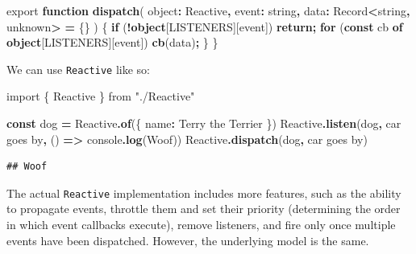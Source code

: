 \documentclass[
]{book}
\newenvironment{Shaded}{\begin{snugshade}}{\end{snugshade}}
\newcommand{\BuiltInTok}[1]{#1}
\newcommand{\ControlFlowTok}[1]{\textcolor[rgb]{0.13,0.29,0.53}{\textbf{#1}}}
\newcommand{\DataTypeTok}[1]{\textcolor[rgb]{0.13,0.29,0.53}{#1}}
\newcommand{\FunctionTok}[1]{\textcolor[rgb]{0.13,0.29,0.53}{\textbf{#1}}}
\newcommand{\ImportTok}[1]{#1}
\newcommand{\KeywordTok}[1]{\textcolor[rgb]{0.13,0.29,0.53}{\textbf{#1}}}
\newcommand{\NormalTok}[1]{#1}
\newcommand{\OperatorTok}[1]{\textcolor[rgb]{0.81,0.36,0.00}{\textbf{#1}}}
\newcommand{\StringTok}[1]{\textcolor[rgb]{0.31,0.60,0.02}{#1}}
\newcommand{\VerbatimStringTok}[1]{\textcolor[rgb]{0.31,0.60,0.02}{#1}}
\theoremstyle{definition}
\theoremstyle{definition}
\theoremstyle{definition}
\theoremstyle{definition}
\theoremstyle{remark}
\begin{document}
\begin{Shaded}
\begin{Highlighting}[]
  \ImportTok{export} \KeywordTok{function} \FunctionTok{dispatch}\NormalTok{(}
\NormalTok{    object}\OperatorTok{:}\NormalTok{ Reactive}\OperatorTok{,}
\NormalTok{    event}\OperatorTok{:} \DataTypeTok{string}\OperatorTok{,}
\NormalTok{    data}\OperatorTok{:} \BuiltInTok{Record}\OperatorTok{\textless{}}\DataTypeTok{string}\OperatorTok{,} \DataTypeTok{unknown}\OperatorTok{\textgreater{}} \OperatorTok{=}\NormalTok{ \{\}}
\NormalTok{  ) \{}
    \ControlFlowTok{if}\NormalTok{ (}\OperatorTok{!}\KeywordTok{object}\NormalTok{[LISTENERS][}\BuiltInTok{event}\NormalTok{]) }\ControlFlowTok{return}\OperatorTok{;}
    \ControlFlowTok{for}\NormalTok{ (}\KeywordTok{const}\NormalTok{ cb }\KeywordTok{of} \KeywordTok{object}\NormalTok{[LISTENERS][}\BuiltInTok{event}\NormalTok{]) }\FunctionTok{cb}\NormalTok{(data)}\OperatorTok{;}
\NormalTok{  \}}
\NormalTok{\}}
\end{Highlighting}
\end{Shaded}

We can use \texttt{Reactive} like so:

\begin{Shaded}
\begin{Highlighting}[]
\ImportTok{import}\NormalTok{ \{ Reactive \} }\ImportTok{from} \StringTok{"./Reactive"}

\KeywordTok{const}\NormalTok{ dog }\OperatorTok{=}\NormalTok{ Reactive}\OperatorTok{.}\FunctionTok{of}\NormalTok{(\{ name}\OperatorTok{:} \VerbatimStringTok{\textasciigrave{}Terry the Terrier\textasciigrave{}}\NormalTok{ \})}
\NormalTok{Reactive}\OperatorTok{.}\FunctionTok{listen}\NormalTok{(dog}\OperatorTok{,} \VerbatimStringTok{\textasciigrave{}car goes by\textasciigrave{}}\OperatorTok{,}\NormalTok{ () }\KeywordTok{=\textgreater{}} \BuiltInTok{console}\OperatorTok{.}\FunctionTok{log}\NormalTok{(}\VerbatimStringTok{\textasciigrave{}Woof\textasciigrave{}}\NormalTok{))}
\NormalTok{Reactive}\OperatorTok{.}\FunctionTok{dispatch}\NormalTok{(dog}\OperatorTok{,} \VerbatimStringTok{\textasciigrave{}car goes by\textasciigrave{}}\NormalTok{)}
\end{Highlighting}
\end{Shaded}

\begin{verbatim}
## Woof
\end{verbatim}

The actual \texttt{Reactive} implementation includes more features, such as the ability to propagate events, throttle them and set their priority (determining the order in which event callbacks execute), remove listeners, and fire only once multiple events have been dispatched. However, the underlying model is the same.
\end{document}
